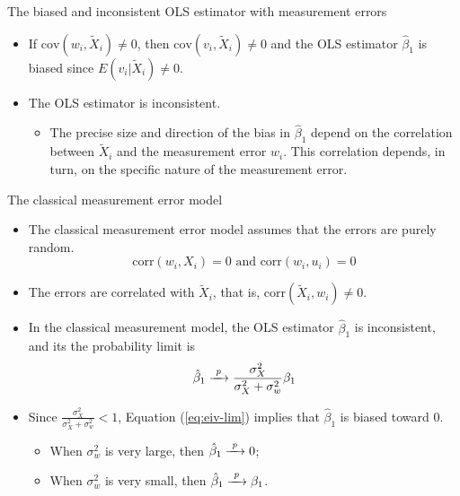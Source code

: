 \documentclass[presentation,10pt]{beamer}
\newcommand{\cov}{\mathrm{cov}}
\newcommand{\corr}{\mathrm{corr}}
\newcommand{\rarrowd}[1]{\xrightarrow{\text{ \textit #1 }}}
\begin{document}
\begin{frame}[label={sec:org1cbd779}]{The biased and inconsistent OLS estimator with measurement errors}
\begin{itemize}
\item If \(\cov(w_i, \tilde{X}_i) \neq 0\), then \(\cov(v_i, \tilde{X}_i)
  \neq 0\) and the OLS estimator \(\hat{\beta}_1\) is biased since
\(E(v_i | \tilde{X}_i) \neq 0\).
\end{itemize}

\vspace{0.3cm}

\begin{itemize}
\item The OLS estimator is inconsistent.
\begin{itemize}
\item The precise size and direction of the bias in \(\hat{\beta}_1\) depend
on the correlation between \(\tilde{X}_i\) and the measurement error
\(w_i\). This correlation depends, in turn, on the specific nature of
the measurement error.
\end{itemize}
\end{itemize}
\end{frame}

\begin{frame}[label={sec:org43d6f9f}]{The classical measurement error model}
\begin{itemize}
\item The classical measurement error model assumes that the errors are
purely random. 
$$\corr(w_i, X_i) = 0 \text{ and }\corr(w_i, u_i) = 0$$

\item The errors are correlated with \(\tilde{X}_i\), that is,
\(\corr(\tilde{X}_i, w_i) \neq 0\).

\item In the classical measurement model, the OLS estimator
\(\hat{\beta}_1\) is inconsistent, and its the probability limit is
\begin{equation}
\label{eq:eiv-lim}
\hat{\beta}_1 \rarrowd{p} \frac{\sigma^2_X}{\sigma^2_X + \sigma^2_w}\beta_1
\end{equation}

\item Since \(\frac{\sigma^2_X}{\sigma^2_X + \sigma^2_w} < 1\), Equation
(\ref{eq:eiv-lim}) implies that
\(\hat{\beta}_1\) is biased toward 0.
\begin{itemize}
\item When \(\sigma^2_w\) is very large, then \(\hat{\beta}_1 \rarrowd{p} 0\);
\item When \(\sigma^2_w\) is very small, then \(\hat{\beta}_1 \rarrowd{p} \beta_1\).
\end{itemize}
\end{itemize}
\end{frame}
\end{document}
